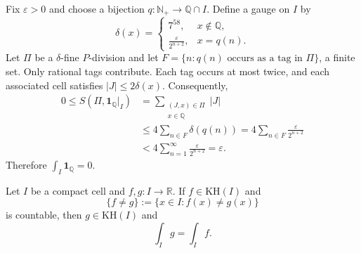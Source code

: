 \begin{proofenv}
Fix $\varepsilon>0$ and choose a bijection
$q:\mathbb N_+\to\mathbb Q\cap I$. Define a gauge on $I$ by
\[
    \delta(x)=
    \begin{cases}
        7^{58},&x\notin\mathbb Q,\\
        \displaystyle\frac{\varepsilon}{2^{n+2}},&x=q(n).
    \end{cases}
\]
Let $\Pi$ be a $\delta$-fine $P$-division and let
$F=\{n:q(n)\text{ occurs as a tag in }\Pi\}$, a finite set.
Only rational tags contribute. Each tag occurs at most twice, and
each associated cell satisfies $|J|\le2\delta(x)$. Consequently,
\[
\begin{aligned}
    0\le S(\Pi,\mathbf1_{\mathbb Q}|_I)
    &=\sum_{\substack{(J,x)\in\Pi\\x\in\mathbb Q}}|J|\\
    &\le4\sum_{n\in F}\delta(q(n))
      =4\sum_{n\in F}\frac{\varepsilon}{2^{n+2}}\\
    &<4\sum_{n=1}^{\infty}\frac{\varepsilon}{2^{n+2}}
      =\varepsilon.
\end{aligned}
\]
Therefore $\int_I\mathbf1_{\mathbb Q}=0$.
\end{proofenv}

\begin{theoremenv}\label{thm:kh-countable-changes}
Let $I$ be a compact cell and $f,g:I\to\mathbb R$. If
$f\in\mathrm{KH}(I)$ and
\[
    \{f\ne g\}:=\{x\in I:f(x)\ne g(x)\}
\]
is countable, then $g\in\mathrm{KH}(I)$ and
\[
    \int_I g=\int_I f.
\]
\end{theoremenv}
